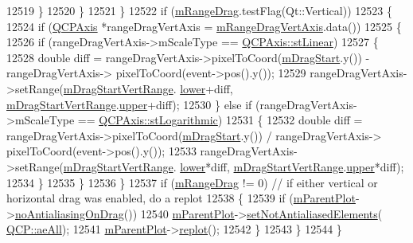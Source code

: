 \begin{DoxyCode}
12519         \}
12520       \}
12521     \}
12522     \textcolor{keywordflow}{if} (\hyperlink{class_q_c_p_axis_rect_aa9f107f66ca3469ad50ee6cea7c9e237}{mRangeDrag}.testFlag(Qt::Vertical))
12523     \{
12524       \textcolor{keywordflow}{if} (\hyperlink{class_q_c_p_axis}{QCPAxis} *rangeDragVertAxis = \hyperlink{class_q_c_p_axis_rect_a3e41dffec18987366f2a8ffd80689c12}{mRangeDragVertAxis}.data())
12525       \{
12526         \textcolor{keywordflow}{if} (rangeDragVertAxis->mScaleType == \hyperlink{class_q_c_p_axis_a36d8e8658dbaa179bf2aeb973db2d6f0aff6e30a11a828bc850caffab0ff994f6}{QCPAxis::stLinear})
12527         \{
12528           \textcolor{keywordtype}{double} diff = rangeDragVertAxis->pixelToCoord(\hyperlink{class_q_c_p_axis_rect_a032896b28f83a58010d8d533b78c49df}{mDragStart}.y()) - rangeDragVertAxis->
      pixelToCoord(event->pos().y());
12529           rangeDragVertAxis->setRange(\hyperlink{class_q_c_p_axis_rect_a1a5ae4c74b8bd46baf91bf4e4f4165f0}{mDragStartVertRange}.
      \hyperlink{class_q_c_p_range_aa3aca3edb14f7ca0c85d912647b91745}{lower}+diff, \hyperlink{class_q_c_p_axis_rect_a1a5ae4c74b8bd46baf91bf4e4f4165f0}{mDragStartVertRange}.\hyperlink{class_q_c_p_range_ae44eb3aafe1d0e2ed34b499b6d2e074f}{upper}+diff);
12530         \} \textcolor{keywordflow}{else} \textcolor{keywordflow}{if} (rangeDragVertAxis->mScaleType == \hyperlink{class_q_c_p_axis_a36d8e8658dbaa179bf2aeb973db2d6f0abf5b785ad976618816dc6f79b73216d4}{QCPAxis::stLogarithmic})
12531         \{
12532           \textcolor{keywordtype}{double} diff = rangeDragVertAxis->pixelToCoord(\hyperlink{class_q_c_p_axis_rect_a032896b28f83a58010d8d533b78c49df}{mDragStart}.y()) / rangeDragVertAxis->
      pixelToCoord(event->pos().y());
12533           rangeDragVertAxis->setRange(\hyperlink{class_q_c_p_axis_rect_a1a5ae4c74b8bd46baf91bf4e4f4165f0}{mDragStartVertRange}.
      \hyperlink{class_q_c_p_range_aa3aca3edb14f7ca0c85d912647b91745}{lower}*diff, \hyperlink{class_q_c_p_axis_rect_a1a5ae4c74b8bd46baf91bf4e4f4165f0}{mDragStartVertRange}.\hyperlink{class_q_c_p_range_ae44eb3aafe1d0e2ed34b499b6d2e074f}{upper}*diff);
12534         \}
12535       \}
12536     \}
12537     \textcolor{keywordflow}{if} (\hyperlink{class_q_c_p_axis_rect_aa9f107f66ca3469ad50ee6cea7c9e237}{mRangeDrag} != 0) \textcolor{comment}{// if either vertical or horizontal drag was enabled, do a replot}
12538     \{
12539       \textcolor{keywordflow}{if} (\hyperlink{class_q_c_p_layerable_aa2a528433e44db02b8aef23c1f9f90ed}{mParentPlot}->\hyperlink{class_q_custom_plot_ae07f2895a34d13a97a10cae4d8e17a36}{noAntialiasingOnDrag}())
12540         \hyperlink{class_q_c_p_layerable_aa2a528433e44db02b8aef23c1f9f90ed}{mParentPlot}->\hyperlink{class_q_custom_plot_ae10d685b5eabea2999fb8775ca173c24}{setNotAntialiasedElements}(
      \hyperlink{namespace_q_c_p_ae55dbe315d41fe80f29ba88100843a0caa897c232a0ffc8368e7c100ffc59ef31}{QCP::aeAll});
12541       \hyperlink{class_q_c_p_layerable_aa2a528433e44db02b8aef23c1f9f90ed}{mParentPlot}->\hyperlink{class_q_custom_plot_a606fd384b2a637ce2c24899bcbde77d6}{replot}();
12542     \}
12543   \}
12544 \}
\end{DoxyCode}


